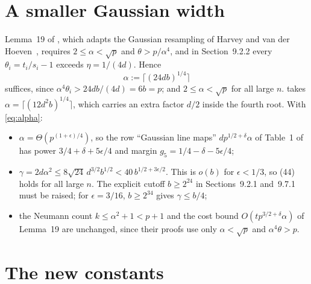 \documentclass[11pt]{article}
\numberwithin{equation}{section}
\numberwithin{table}{section}
\theoremstyle{remark}
\newcommand{\OAI}{\cite{OAI}}
\begin{document}
\section{A smaller Gaussian width}\label{sec:alpha}

Lemma~19 of \OAI{}, which adapts the Gaussian resampling of
Harvey and van der Hoeven~\cite[Theorem~4.2, Proposition~4.7 and
Lemmas~4.8--4.12]{HvdH},
requires $2\le\alpha<\sqrt p$ and $\theta>p/\alpha^4$,
and in Section~9.2.2 every $\theta_i=t_i/s_i-1$ exceeds
$\eta=1/(4d)$. Hence
\begin{equation}\label{eq:alpha}
 \alpha:=\bigl\lceil(24db)^{1/4}\bigr\rceil
\end{equation}
suffices, since $\alpha^4\theta_i>24db/(4d)=6b=p$; and $2\le\alpha<\sqrt
p$ for all large $n$. \OAI{} takes $\alpha=\lceil(12d^2b)^{1/4}\rceil$,
which carries an extra factor $d/2$ inside the fourth root. With
\eqref{eq:alpha}:
\begin{itemize}
\item $\alpha=\Theta(p^{(1+\epsilon)/4})$, so the row ``Gaussian line
maps'' $dp^{1/2+\delta}\alpha$ of Table~1 of \OAI{} has power
$3/4+\delta+5\epsilon/4$ and margin
$g_5=1/4-\delta-5\epsilon/4$;
\item $\gamma=2d\alpha^2\le8\sqrt{24}\,d^{3/2}b^{1/2}<40\,b^{1/2+3\epsilon/2}$.
This is $o(b)$ for $\epsilon<1/3$, so (44) holds for all large $n$. The
explicit cutoff $b\ge2^{24}$ in Sections~9.2.1 and~9.7.1 must be raised;
for $\epsilon=3/16$, $b\ge2^{34}$ gives $\gamma\le b/4$;
\item the Neumann count $k\le\alpha^2+1<p+1$ and the cost bound
$O(tp^{3/2+\delta}\alpha)$ of Lemma~19 are unchanged, since their
proofs use only $\alpha<\sqrt p$ and $\alpha^4\theta>p$.
\end{itemize}

\section{The new constants}\label{sec:constants}
\end{document}
